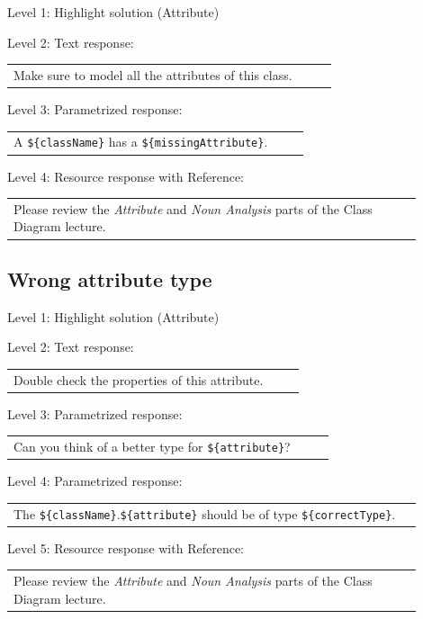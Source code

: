 \noindent Level 1: Highlight solution (Attribute) \medskip

\noindent Level 2: Text response: \medskip

\begin{tabular}{|p{0.9\linewidth}}
Make sure to model all the attributes of this class.
\end{tabular} \medskip

\noindent Level 3: Parametrized response: \medskip

\begin{tabular}{|p{0.9\linewidth}}
A \verb|${className}| has a \verb|${missingAttribute}|.
\end{tabular} \medskip

\noindent Level 4: Resource response with Reference: \medskip

\begin{tabular}{|p{0.9\linewidth}}
Please review the \textit{Attribute} and \textit{Noun Analysis} parts of the Class Diagram lecture.
\end{tabular} \medskip


\subsection{Wrong attribute type}

\noindent Level 1: Highlight solution (Attribute) \medskip

\noindent Level 2: Text response: \medskip

\begin{tabular}{|p{0.9\linewidth}}
Double check the properties of this attribute.
\end{tabular} \medskip

\noindent Level 3: Parametrized response: \medskip

\begin{tabular}{|p{0.9\linewidth}}
Can you think of a better type for \verb|${attribute}|?
\end{tabular} \medskip

\noindent Level 4: Parametrized response: \medskip

\begin{tabular}{|p{0.9\linewidth}}
The \verb|${className}|.\verb|${attribute}| should be of type \verb|${correctType}|.
\end{tabular} \medskip

\noindent Level 5: Resource response with Reference: \medskip

\begin{tabular}{|p{0.9\linewidth}}
Please review the \textit{Attribute} and \textit{Noun Analysis} parts of the Class Diagram lecture.
\end{tabular} \medskip


